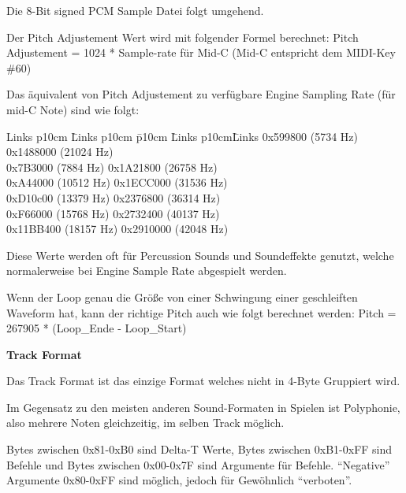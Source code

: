 \documentclass[11pt,a4paper]{scrartcl}
\newcommand{\paratitle}[1] {
    \vspace{5mm}
    \large \textbf{#1} \normalsize
    \vspace{2mm}\newline
}
\begin{document}
Die 8-Bit signed PCM Sample Datei folgt umgehend.

Der Pitch Adjustement Wert wird mit folgender Formel berechnet:\newline
Pitch Adjustement = 1024 * Sample-rate f\"ur Mid-C (Mid-C entspricht dem MIDI-Key \#60)

Das \"aquivalent von Pitch Adjustement zu verf\"ugbare Engine Sampling Rate (f\"ur mid-C Note) sind wie folgt:

\begin{tabbing}
    Links p{10cm} \= Links p{10cm} \=p{10cm} \= Links p{10cm}\= Links \kill
		0x599800  \>(5734 Hz) \>\>0x1488000 \>(21024 Hz)\\
		0x7B3000  \>(7884 Hz)  \>\>0x1A21800 \>(26758 Hz)\\
		0xA44000  \>(10512 Hz)  \>\>0x1ECC000 \>(31536 Hz)\\
		0xD10c00  \>(13379 Hz)  \>\>0x2376800 \>(36314 Hz)\\
		0xF66000  \>(15768 Hz)  \>\>0x2732400 \>(40137 Hz)\\
		0x11BB400 \>(18157 Hz)  \>\>0x2910000 \>(42048 Hz)\\
\end{tabbing}
\vspace{-15pt}
Diese Werte werden oft f\"ur Percussion Sounds und Soundeffekte genutzt, welche normalerweise bei Engine Sample Rate abgespielt werden.

Wenn der Loop genau die Gr\"o{\ss}e von einer Schwingung einer geschleiften Waveform hat, kann der richtige Pitch auch wie folgt berechnet werden:\newline
Pitch = 267905 * (Loop\_Ende - Loop\_Start)

\paratitle{Track Format}
Das Track Format ist das einzige Format welches nicht in 4-Byte Gruppiert wird.

Im Gegensatz zu den meisten anderen Sound-Formaten in Spielen ist Polyphonie, also mehrere Noten gleichzeitig, im selben Track m\"oglich.

Bytes zwischen 0x81-0xB0 sind Delta-T Werte, Bytes zwischen 0xB1-0xFF sind Befehle und Bytes zwischen 0x00-0x7F sind Argumente f\"ur Befehle.
\enquote{Negative} Argumente 0x80-0xFF sind m\"oglich, jedoch f\"ur Gew\"ohnlich \enquote{verboten}.
\end{document}

